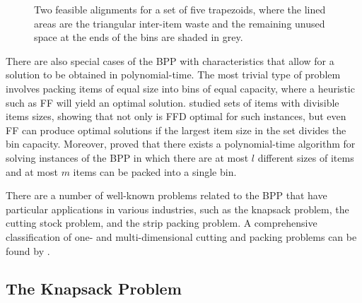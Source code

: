 \documentclass[a4paper,11pt]{article}
\begin{document}
\begin{figure}[h!]	
	\centering
	
	\caption{Two feasible alignments for a set of five trapezoids, where the lined areas are the triangular inter-item waste and the remaining unused space at the ends of the bins are shaded in grey.}	
	\label{fig:tpp}
\end{figure}

\noindent There are also special cases of the BPP with characteristics that allow for a solution to be obtained in polynomial-time. The most trivial type of problem involves packing items of equal size into bins of equal capacity, where a heuristic such as FF will yield an optimal solution. \citet{coffman1987} studied sets of items with divisible items sizes, showing that not only is FFD optimal for such instances, but even FF can produce optimal solutions if the largest item size in the set divides the bin capacity. Moreover, \citet{fernandez1981} proved that there exists a polynomial-time algorithm for solving instances of the BPP in which there are at most $l$ different sizes of items and at most $m$ items can be packed into a single bin.

There are a number of well-known problems related to the BPP that have particular applications in various industries, such as the knapsack problem, the cutting stock problem, and the strip packing problem. A comprehensive classification of one- and multi-dimensional cutting and packing problems can be found by \citet{wascher2007}.


\subsection{The Knapsack Problem}
\label{sub:knapsack}
\end{document}
